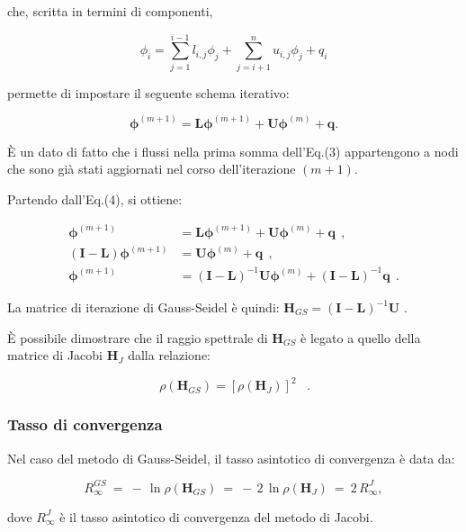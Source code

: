 che, scritta in termini di componenti,

\begin{equation}
	\phi_i = \sum_{j=1}^{i-1} l_{i,j} \phi_j + \sum_{j=i+1}^n u_{i,j} \phi_j + q_i \tag{3}
\end{equation}

permette di impostare il seguente schema iterativo:

\begin{equation}
	\mathbf{\phi}^{(m+1)} = \mathbf{L} \mathbf{\phi}^{(m+1)} + \mathbf{U} \mathbf{\phi}^{(m)} + \mathbf{q}. \tag{4}
\end{equation}

È un dato di fatto che i flussi nella prima somma dell'Eq.(3) appartengono a nodi che sono già stati aggiornati nel corso dell'iterazione $(m+1)$.

Partendo dall'Eq.(4), si ottiene:

\[ \begin{aligned}
\mathbf{\phi}^{(m+1)} &= \mathbf{L} \mathbf{\phi}^{(m+1)} + \mathbf{U} \mathbf{\phi}^{(m)} + \mathbf{q}\ \ ,\\
(\mathbf{I} - \mathbf{L}) \mathbf{\phi}^{(m+1)} &= \mathbf{U} \mathbf{\phi}^{(m)} + \mathbf{q}\ \ ,\\
\mathbf{\phi}^{(m+1)} &= (\mathbf{I} - \mathbf{L})^{-1} \mathbf{U} \mathbf{\phi}^{(m)} + (\mathbf{I} - \mathbf{L})^{-1} \mathbf{q}\ \ . 
\end{aligned}\]

La matrice di iterazione di Gauss-Seidel è quindi: $\boxed{\mathbf{H}_{GS} = (\mathbf{I} - \mathbf{L})^{-1} \mathbf{U}}$ .

È possibile dimostrare che il raggio spettrale di \(\mathbf{H}_{GS}\) è legato a quello della matrice di Jacobi \(\mathbf{H}_J\) dalla relazione:

\[
\boxed{\,\rho(\mathbf{H}_{GS}) = \left[ \rho(\mathbf{H}_J) \right]^2\,}\ \ \ . 
\]

\subsubsection{Tasso di convergenza}

Nel caso del metodo di Gauss-Seidel, il tasso asintotico di convergenza è data da:

\[
R_{\infty}^{GS}\ =\ -\,\ln \rho(\mathbf{H}_{GS})\ =\ -\,2\, \ln \rho(\mathbf{H}_J)\ =\ 2\, R_{\infty}^{J}, 
\]

dove \(R_{\infty}^{J}\) è il tasso asintotico di convergenza del metodo di Jacobi.

